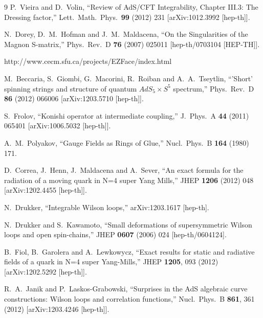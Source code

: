 \documentclass[a4paper,11pt]{article}
\numberwithin{equation}{section}
\begin{document}
\begin{thebibliography} {9}
  P.~Vieira and D.~Volin,
  ``Review of AdS/CFT Integrability, Chapter III.3: The Dressing factor,''
  Lett.\ Math.\ Phys.\  {\bf 99} (2012) 231
  [arXiv:1012.3992 [hep-th]].

  N.~Dorey, D.~M.~Hofman and J.~M.~Maldacena,
  ``On the Singularities of the Magnon S-matrix,''
  Phys.\ Rev.\ D {\bf 76} (2007) 025011
  [hep-th/0703104 [HEP-TH]].

 http://www.cecm.sfu.ca/projects/EZFace/index.html

  M.~Beccaria, S.~Giombi, G.~Macorini, R.~Roiban and A.~A.~Tseytlin,
  ``'Short' spinning strings and structure of quantum $AdS_5 \times S^5$ spectrum,''
  Phys.\ Rev.\ D {\bf 86} (2012) 066006
  [arXiv:1203.5710 [hep-th]].

  S.~Frolov,
  ``Konishi operator at intermediate coupling,''
  J.\ Phys.\ A {\bf 44} (2011) 065401
  [arXiv:1006.5032 [hep-th]].

  A.~M.~Polyakov,
  ``Gauge Fields as Rings of Glue,''
  Nucl.\ Phys.\ B {\bf 164} (1980) 171.

  D.~Correa, J.~Henn, J.~Maldacena and A.~Sever,
  ``An exact formula for the radiation of a moving quark in N=4 super Yang Mills,''
  JHEP {\bf 1206} (2012) 048
  [arXiv:1202.4455 [hep-th]].

  N.~Drukker,
  ``Integrable Wilson loops,''
  arXiv:1203.1617 [hep-th].

  N.~Drukker and S.~Kawamoto,
  ``Small deformations of supersymmetric Wilson loops and open spin-chains,''
  JHEP {\bf 0607} (2006) 024
  [hep-th/0604124].

  B.~Fiol, B.~Garolera and A.~Lewkowycz,
  ``Exact results for static and radiative fields of a quark in N=4 super Yang-Mills,''
  JHEP {\bf 1205}, 093 (2012)
  [arXiv:1202.5292 [hep-th]].

  R.~A.~Janik and P.~Laskos-Grabowski,
  ``Surprises in the AdS algebraic curve constructions: Wilson loops and correlation functions,''
  Nucl.\ Phys.\ B {\bf 861}, 361 (2012)
  [arXiv:1203.4246 [hep-th]].


\end{thebibliography}
\end{document}
